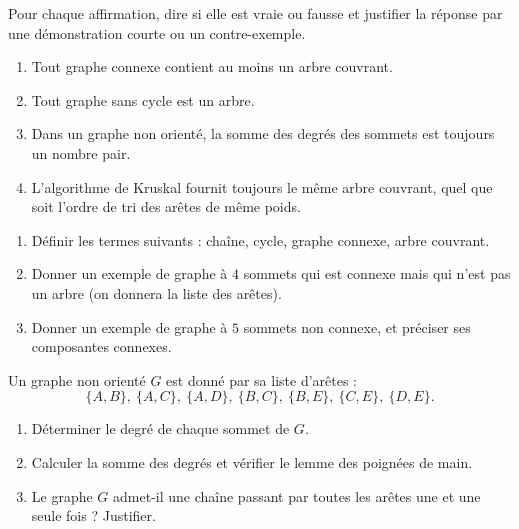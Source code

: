\documentclass[11pt]{article}
\newcommand{\cle}[1]{{\popxbold\color{popdark}#1}}
\newcounter{popsec}
\newcounter{popsub}
\newcommand{\courssub}[1]{%
  \stepcounter{popsub}%
  \par\vspace{9pt}\noindent{\popxbold\fontsize{11.5}{13}\selectfont\color{popink}{\color{poporange}\thepopsec.\thepopsub}\hspace{6pt}#1}\par\nopagebreak\vspace{4pt}
}
\begin{document}
\begin{exercice}
Pour chaque affirmation, dire si elle est vraie ou fausse et justifier la réponse par une démonstration courte ou un contre-exemple.
\begin{enumerate}
\item Tout graphe connexe contient au moins un arbre couvrant.
\item Tout graphe sans cycle est un arbre.
\item Dans un graphe non orienté, la somme des degrés des sommets est toujours un nombre pair.
\item L'algorithme de Kruskal fournit toujours le même arbre couvrant, quel que soit l'ordre de tri des arêtes de même poids.
\end{enumerate}
\end{exercice}

\begin{exercice}
\begin{enumerate}
\item Définir les termes suivants : \cle{chaîne}, \cle{cycle}, \cle{graphe connexe}, \cle{arbre couvrant}.
\item Donner un exemple de graphe à $4$ sommets qui est connexe mais qui n'est pas un arbre (on donnera la liste des arêtes).
\item Donner un exemple de graphe à $5$ sommets non connexe, et préciser ses composantes connexes.
\end{enumerate}
\end{exercice}

\begin{exercice}
Un graphe non orienté $G$ est donné par sa liste d'arêtes :
\[ \{A,B\},\ \{A,C\},\ \{A,D\},\ \{B,C\},\ \{B,E\},\ \{C,E\},\ \{D,E\}. \]
\begin{enumerate}
\item Déterminer le degré de chaque sommet de $G$.
\item Calculer la somme des degrés et vérifier le lemme des poignées de main.
\item Le graphe $G$ admet-il une chaîne passant par toutes les arêtes une et une seule fois ? Justifier.
\end{enumerate}
\end{exercice}

\courssub{Je m'entraîne}
\end{document}
